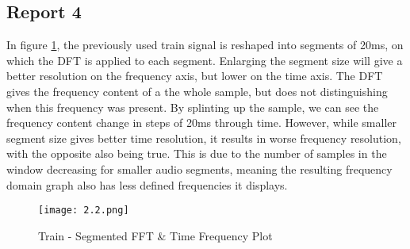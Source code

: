 \subsection*{Report 4}

In figure \ref{figure:2_2}, the previously used train signal is reshaped into segments of 20ms, on which the DFT is applied to each segment. Enlarging the segment size will give a better resolution on the frequency axis, but lower on the time axis. The DFT gives the frequency content of a the whole sample, but does not distinguishing when this frequency was present. By splinting up the sample, we can see the frequency content change in steps of 20ms through time. However, while smaller segment size gives better time resolution, it results in worse frequency resolution, with the opposite also being true. This is due to the number of samples in the window decreasing for smaller audio segments, meaning the resulting frequency domain graph also has less defined frequencies it displays.

	\begin{figure}[H] 
		\centering
		\texttt{[image: 2.2.png]}
		\caption{Train - Segmented FFT \& Time Frequency Plot}
		\label{figure:2_2}
	\end{figure}
	
	